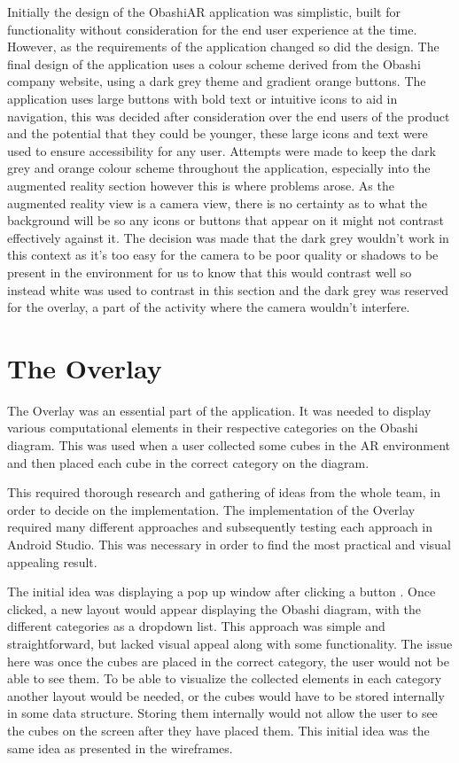 \documentclass{l3proj}
\begin{document}
Initially the design of the ObashiAR application was simplistic, built for functionality without consideration for the end user experience at the time. However, as the requirements of the application changed so did the design. The final design of the application uses a colour scheme derived from the Obashi company website\cite{ObashiWebsite}, using a dark grey theme and gradient orange buttons. The application uses large buttons with bold text or intuitive icons to aid in navigation, this was decided after consideration over the end users of the product and the potential that they could be younger, these large icons and text were used to ensure accessibility for any user. Attempts were made to keep the dark grey and orange colour scheme throughout the application, especially into the augmented reality section however this is where problems arose. As the augmented reality view is a camera view, there is no certainty as to what the background will be so any icons or buttons that appear on it might not contrast effectively against it. The decision was made that the dark grey wouldn’t work in this context as it’s too easy for the camera to be poor quality or shadows to be present in the environment for us to know that this would contrast well so instead white was used to contrast in this section and the dark grey was reserved for the overlay, a part of the activity where the camera wouldn’t interfere. 

\section{The Overlay}

The Overlay was an essential part of the application. It was needed to display
various computational elements in their respective categories on the Obashi diagram. 
This was used when a user collected some cubes in the AR environment and then placed 
each cube in the correct category on the diagram.

This required thorough research and gathering of ideas from the whole team, in order 
to decide on the implementation. The implementation of the Overlay required many different
approaches and subsequently testing each approach in Android Studio. This was necessary in order 
to find the most practical and visual appealing result. 

The initial idea was displaying a pop up window after clicking a button \cite{PopUpWindow}.
Once clicked, a new layout would appear displaying the Obashi diagram, with the
different categories as a dropdown list\cite{DropList}. This approach was simple and 
straightforward, but lacked visual appeal along with some functionality. The issue here 
was once the cubes are placed in the correct category, the user would not be able to see them. 
To be able to visualize the collected elements in each category another layout would be needed,
or the cubes would have to be stored internally in some data structure. Storing them internally 
would not allow the user to see the cubes on the screen after they have placed them. 
This initial idea was the same idea as presented in the wireframes.
\end{document}
